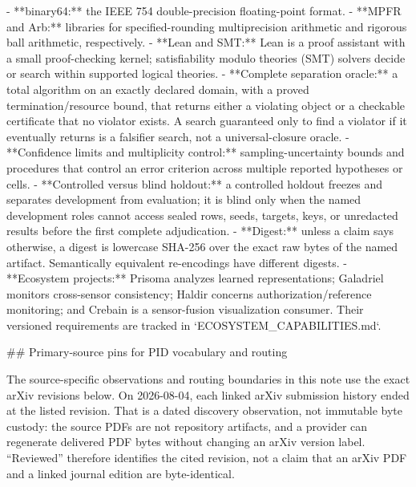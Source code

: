 \documentclass[11pt]{article}
\begin{document}
\begin{markdown}
- **binary64:** the IEEE 754 double-precision floating-point format.
- **MPFR and Arb:** libraries for specified-rounding multiprecision arithmetic and rigorous ball
  arithmetic, respectively.
- **Lean and SMT:** Lean is a proof assistant with a small proof-checking kernel; satisfiability
  modulo theories (SMT) solvers decide or search within supported logical theories.
- **Complete separation oracle:** a total algorithm on an exactly declared domain, with a proved
  termination/resource bound, that returns either a violating object or a checkable certificate
  that no violator exists. A search guaranteed only to find a violator if it eventually returns is
  a falsifier search, not a universal-closure oracle.
- **Confidence limits and multiplicity control:** sampling-uncertainty bounds and procedures that
  control an error criterion across multiple reported hypotheses or cells.
- **Controlled versus blind holdout:** a controlled holdout freezes and separates development from
  evaluation; it is blind only when the named development roles cannot access sealed rows, seeds,
  targets, keys, or unredacted results before the first complete adjudication.
- **Digest:** unless a claim says otherwise, a digest is lowercase SHA-256 over the exact raw bytes
  of the named artifact. Semantically equivalent re-encodings have different digests.
- **Ecosystem projects:** Prisoma analyzes learned representations; Galadriel monitors
  cross-sensor consistency; Haldir concerns authorization/reference monitoring; and Crebain is a
  sensor-fusion visualization consumer. Their versioned requirements are tracked in
  `ECOSYSTEM_CAPABILITIES.md`.

## Primary-source pins for PID vocabulary and routing

The source-specific observations and routing boundaries in this note use the exact arXiv revisions
below. On 2026-08-04, each linked arXiv submission history ended at the listed revision. That is a
dated discovery observation, not immutable byte custody: the source PDFs are not repository
artifacts, and a provider can regenerate delivered PDF bytes without changing an arXiv version
label. “Reviewed” therefore identifies the cited revision, not a claim that an arXiv PDF and a
linked journal edition are byte-identical.


\end{markdown}
\end{document}
